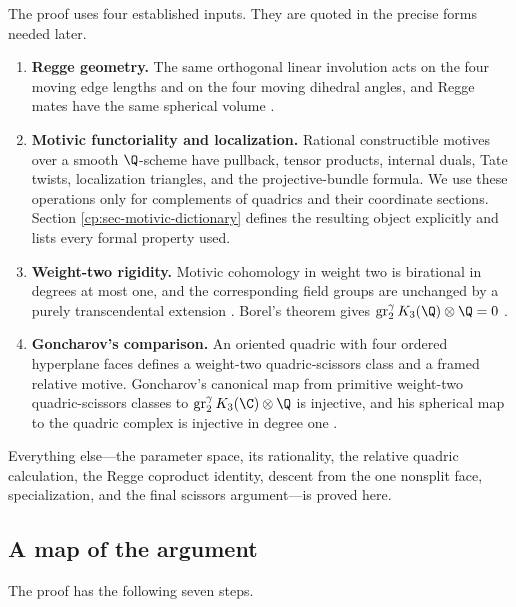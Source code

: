 The proof uses four established inputs.  They are quoted in the precise
forms needed later.

\begin{enumerate}[label=\textup{(I\arabic*)},leftmargin=2.7em]
\item \textbf{Regge geometry.}  The same orthogonal linear involution acts
on the four moving edge lengths and on the four moving dihedral angles, and
Regge mates have the same spherical volume
\cite{AkopyanIzmestiev2019}.

\item \textbf{Motivic functoriality and localization.}  Rational
constructible motives over a smooth \(\Q\)-scheme have pullback, tensor
products, internal duals, Tate twists, localization triangles, and the
projective-bundle formula.  We use these operations only for complements
of quadrics and their coordinate sections.  Section
\ref{cp:sec-motivic-dictionary} defines the resulting object explicitly
and lists every formal property used.

\item \textbf{Weight-two rigidity.}  Motivic cohomology in weight two is
birational in degrees at most one, and the corresponding field groups are
unchanged by a purely transcendental extension
\cite{Garkusha2023}.  Borel's theorem gives
\(\gr_2^\gamma K_3(\Q)\otimes\Q=0\) \cite{Borel1977}.

\item \textbf{Goncharov's comparison.}  An oriented quadric with four
ordered hyperplane faces defines a weight-two quadric-scissors class and a
framed relative motive.  Goncharov's canonical map from primitive
weight-two quadric-scissors classes to
\(\gr_2^\gamma K_3(\C)\otimes\Q\) is injective, and his spherical map to
the quadric complex is injective in degree one
\cite[Theorems~4.13 and~4.14]{Goncharov1999}.
\end{enumerate}

Everything else---the parameter space, its rationality, the relative
quadric calculation, the Regge coproduct identity, descent from the one
nonsplit face, specialization, and the final scissors argument---is proved
here.

\subsection{A map of the argument}

The proof has the following seven steps.

